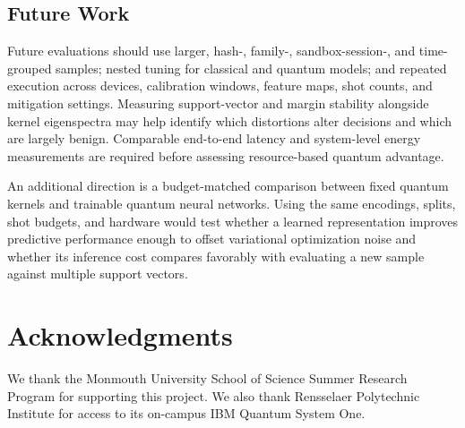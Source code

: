 \documentclass[letterpaper]{article} %
\begin{document}
\subsection{Future Work}

Future evaluations should use larger, hash-, family-, sandbox-session-, and time-grouped samples; nested tuning for classical and quantum models; and repeated execution across devices, calibration windows, feature maps, shot counts, and mitigation settings. Measuring support-vector and margin stability alongside kernel eigenspectra may help identify which distortions alter decisions and which are largely benign. Comparable end-to-end latency and system-level energy measurements are required before assessing resource-based quantum advantage.

An additional direction is a budget-matched comparison between fixed quantum kernels and trainable quantum neural networks. Using the same encodings, splits, shot budgets, and hardware would test whether a learned representation improves predictive performance enough to offset variational optimization noise and whether its inference cost compares favorably with evaluating a new sample against multiple support vectors.

\section{Acknowledgments}

We thank the Monmouth University School of Science Summer Research Program for supporting this project. We also thank Rensselaer Polytechnic Institute for access to its on-campus IBM Quantum System One.


\end{document}
